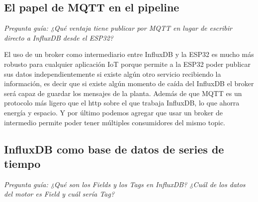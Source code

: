\documentclass[11pt, letterpaper]{article}
\begin{document}
\vspace{0.4cm}

\subsection{El papel de MQTT en el pipeline}

\textit{Pregunta gu\'ia: ¿Qu\'e ventaja tiene publicar por MQTT
en lugar de escribir directo a InfluxDB desde el ESP32?}

El uso de un broker como intermediario entre InfluxDB y la ESP32 es mucho más robusto para cualquier aplicaci\'on IoT porque permite a la ESP32 poder publicar sus datos independientemente si existe alg\'un otro servicio recibiendo la informaci\'on, es decir que si existe alg\'un momento de ca\'ida del InfluxDB el broker ser\'a capaz de guardar los mensajes de la planta. Adem\'as de que MQTT es un protocolo m\'as ligero que el http sobre el que trabaja InfluxDB, lo que ahorra energ\'ia y espacio. Y por \'ultimo podemos agregar que usar un broker de intermedio permite poder tener m\'ultiples consumidores del mismo topic.

\vspace{0.4cm}

\subsection{InfluxDB como base de datos de series de tiempo}

\textit{Pregunta gu\'ia: ¿Qué son los Fields y los Tags en InfluxDB?
¿Cu\'al de los datos del motor es Field y cu\'al ser\'ia Tag?}
\end{document}
